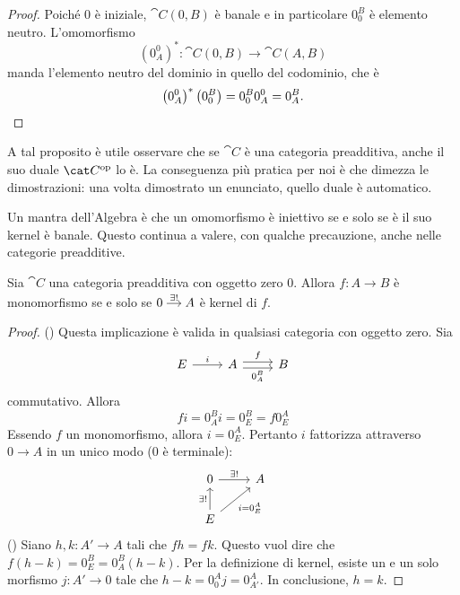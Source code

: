 \begin{proof}
  Poiché \(0\) è iniziale, \(\cat C(0, B)\) è banale e in particolare
  \(0_0^B\) è elemento neutro. L'omomorfismo
  \[
    \left(0_A^0\right)^\ast : \cat C(0, B) \to \cat C(A, B)
  \]
  manda l'elemento neutro del dominio in quello del codominio, che è
  \[
    \left(0_A^0\right)^\ast\left(0_0^B\right) = 0_0^B 0_A^0 = 0_A^B
    . \qedhere
  \]
\end{proof}

\begin{remark}
  A tal proposito è utile osservare che se \(\cat C\) è una categoria
  preadditiva, anche il suo duale \(\opcat C\) lo è. La conseguenza più
  pratica per noi è che dimezza le dimostrazioni: una volta dimostrato
  un enunciato, quello duale è automatico.
\end{remark}

Un mantra dell'Algebra è che un omomorfismo è iniettivo se e solo se è
il suo kernel è banale. Questo continua a valere, con qualche
precauzione, anche nelle categorie preadditive.

\begin{proposition}\label{proposition:MonoIffKerIsTrivial}
  Sia \(\cat C\) una categoria preadditiva con oggetto zero
  \(0\). Allora \(f : A \to B\) è monomorfismo se e solo se
  \(\begin{tikzcd}[column sep=small, cramped] 0 \ar["{\exists!}", r] &
    A \end{tikzcd}\) è kernel di \(f\).
\end{proposition}

\begin{proof}
  (\Rightarrow) Questa implicazione è valida in qualsiasi categoria con
  oggetto zero. Sia
  \[
    \begin{tikzcd}
      E \ar["{i}", r] & A \ar["{f}", r, shift left] \ar["{0_A^B}", r,
      shift right, swap] & B
    \end{tikzcd}
  \]
  commutativo. Allora
  \[
    f i = 0_A^B i = 0_E^B = f 0_E^A
  \]
  Essendo \(f\) un monomorfismo, allora \(i = 0_E^A\). Pertanto \(i\)
  fattorizza attraverso \(0 \to A\) in un unico modo (\(0\) è terminale):
  \[
    \begin{tikzcd}
      0 \ar["{\exists!}", r] & A \\
      E \ar["{\exists!}", u] \ar["{i = 0_E^A}", ur, swap]
    \end{tikzcd}
  \]
  (\Leftarrow) Siano \(h, k : A' \to A\) tali che \(f h = f k\). Questo
  vuol dire che \(f (h-k) = 0_E^B = 0_A^B (h-k)\). Per la definizione di
  kernel, esiste un e un solo morfismo \(j : A' \to 0\) tale che
  \(h-k = 0_0^A j = 0_{A'}^A\). In conclusione, \(h = k\).
\end{proof}


